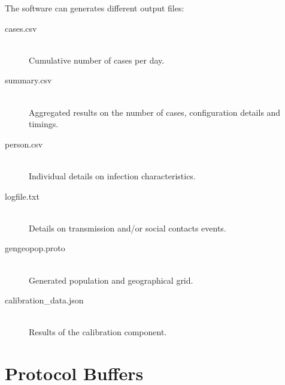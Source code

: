 The software can generates different output files:
\begin{description}
	\item [cases.csv] \ \\
	Cumulative number of cases per day.
	\item [summary.csv] \ \\
	Aggregated results on the number of cases, configuration details and timings.
	\item [person.csv] \ \\
	Individual details on infection characteristics.
	\item [logfile.txt] \ \\
	Details on transmission and/or social contacts events.
    \item [gengeopop.proto] \ \\
    Generated population and geographical grid.
    \item [calibration\_data.json] \ \\
    Results of the calibration component.
\end{description}


\section{Protocol Buffers}
\label{section:protobuf}

